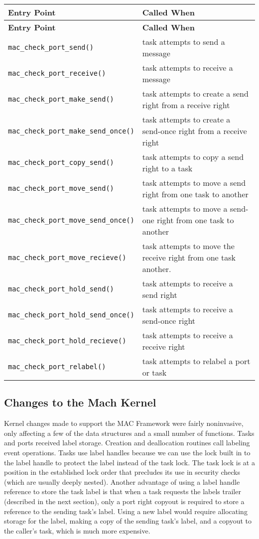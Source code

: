 \begin{longtable}{|p{2.2in}|p{2.3in}|}
\hline
{\bf Entry Point} & {\bf Called When} \\
\hline
\hline
\endfirsthead
\hline
{\bf Entry Point} & {\bf Called When} \\
\hline
\hline
\endhead
\hline
\endfoot
{\tt mac\_check\_port\_send()} & task attempts to send a message \\[3mm]
\hline
{\tt mac\_check\_port\_receive()} & task attempts to receive a message \\[3mm]
\hline
{\tt mac\_check\_port\_make\_send()} & task attempts to create a send right from a receive right \\[3mm]
{\tt mac\_check\_port\_make\_send\_once()} & task attempts to create a send-once right from a receive right \\[3mm]
\hline
{\tt mac\_check\_port\_copy\_send()} & task attempts to copy a send right to a task \\[3mm]
{\tt mac\_check\_port\_move\_send()} & task attempts to move a send right from one task to another \\[3mm]
{\tt mac\_check\_port\_move\_send\_once()} & task attempts to move a send-one right from one task to another \\[3mm]
\hline
{\tt mac\_check\_port\_move\_recieve()} & task attempts to move the receive right from one task another. \\[3mm]
\hline
{\tt mac\_check\_port\_hold\_send()} & task attempts to receive a send right \\[3mm]
{\tt mac\_check\_port\_hold\_send\_once()} & task attempts to receive a send-once right \\[3mm]
\hline
{\tt mac\_check\_port\_hold\_recieve()} & task attempts to receive a receive right \\[3mm]
\hline
{\tt mac\_check\_port\_relabel()} & task attempts to relabel a port or task \\[3mm]
\end{longtable}

\subsection{Changes to the Mach Kernel}

Kernel changes made to support the MAC Framework were fairly
noninvasive, only affecting a few of the data structures and a small
number of functions.  Tasks and ports received label storage.
Creation and deallocation routines call labeling event operations.
Tasks use label handles because we can use the lock built in to the
label handle to protect the label instead of the task lock. The task
lock is at a position in the established lock order that precludes its
use in security checks (which are usually deeply nested).  Another
advantage of using a label handle reference to store the task label is
that when a task requests the labels trailer (described in the next
section), only a port right copyout is required to store a reference
to the sending task's label.  Using a new label would require
allocating storage for the label, making a copy of the sending task's
label, and a copyout to the caller's task, which is much more
expensive.

